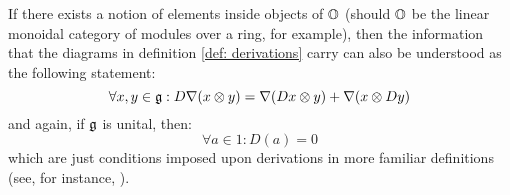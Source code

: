                 \begin{remark}
                    If there exists a notion of elements inside objects of $\mathbb{O}$ (should $\mathbb{O}$ be the linear monoidal category of modules over a ring, for example), then the information that the diagrams in definition \ref{def: derivations} carry can also be understood as the following statement:
                        $$\forall x, y \in \g: D \nabla(x \tensor y) = \nabla(Dx \tensor y) + \nabla(x \tensor Dy)$$
                    and again, if $\mathfrak{g}$ is unital, then:
                        $$\forall a \in 1: D(a) = 0$$
                    which are just conditions imposed upon derivations in more familiar definitions (see, for instance, \cite[\href{https://stacks.math.columbia.edu/tag/00RN}{Tag 00RN}]{stacks}). 
                \end{remark}
                

